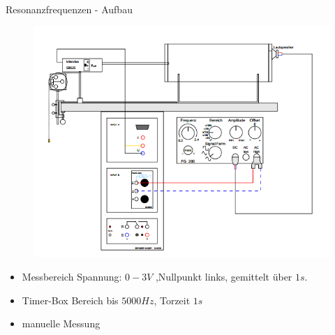\documentclass[14pt]{beamer}
\begin{document}


\begin{frame}{Resonanzfrequenzen - Aufbau}
\begin{figure}
\begin{flushleft}
\includegraphics[scale=0.35]{aufbau}
\end{flushleft}
\end{figure}

\begin{flushright}
\begin{itemize}
\item  Messbereich Spannung: $0-3V$ ,Nullpunkt links, gemittelt über $1s$.
\item Timer-Box Bereich bis $5000Hz$, Torzeit $1s$
\item manuelle Messung
\end{itemize}
\end{flushright}
\end{frame}
\end{document}
